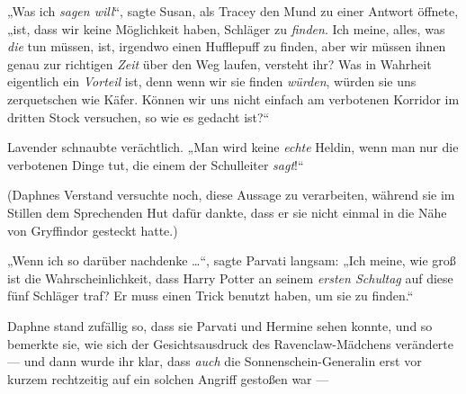 „Was ich \emph{sagen will}“, sagte Susan, als Tracey den Mund zu einer Antwort öffnete, „ist, dass wir keine Möglichkeit haben, Schläger zu \emph{finden}. Ich meine, alles, was \emph{die} tun müssen, ist, irgendwo einen Hufflepuff zu finden, aber wir müssen ihnen genau zur richtigen \emph{Zeit} über den Weg laufen, versteht ihr? Was in Wahrheit eigentlich ein \emph{Vorteil} ist, denn wenn wir sie finden \emph{würden}, würden sie uns zerquetschen wie Käfer. Können wir uns nicht einfach am verbotenen Korridor im dritten Stock versuchen, so wie es gedacht ist?“

Lavender schnaubte verächtlich.
„Man wird keine \emph{echte} Heldin, wenn man nur die verbotenen Dinge tut, die einem der Schulleiter \emph{sagt}!“

(Daphnes Verstand versuchte noch, diese Aussage zu verarbeiten, während sie im Stillen dem Sprechenden Hut dafür dankte, dass er sie nicht einmal in die Nähe von Gryffindor gesteckt hatte.)

„Wenn ich so darüber nachdenke …“, sagte Parvati langsam:
„Ich meine, wie groß ist die Wahrscheinlichkeit, dass Harry Potter an seinem \emph{ersten Schultag} auf diese fünf Schläger traf? Er muss einen Trick benutzt haben, um sie zu finden.“

Daphne stand zufällig so, dass sie Parvati und Hermine sehen konnte, und so bemerkte sie, wie sich der Gesichtsausdruck des Ravenclaw-Mädchens veränderte — und dann wurde ihr klar, dass \emph{auch} die Sonnenschein-Generalin erst vor kurzem rechtzeitig auf ein solchen Angriff gestoßen war —

